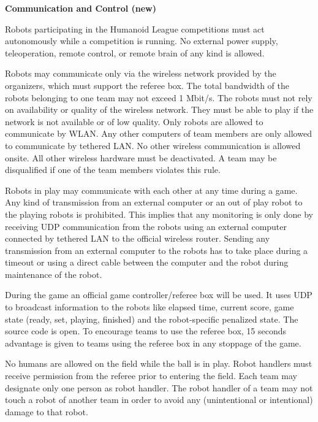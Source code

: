 {\bfseries Communication and Control (new)}

\headlinebox

Robots participating in the Humanoid League competitions must act autonomously while a competition is running. No external power supply, teleoperation, remote control, or remote brain of any kind is allowed.

\bigskip

Robots may communicate only via the wireless network provided by the organizers, which must support the referee box. The total bandwidth of the robots belonging to one team may not exceed 1 Mbit/s. The robots must not rely on availability or quality of the wireless network. They
must be able to play if the network is not available or of low quality. Only robots are allowed to communicate by WLAN. Any other computers of team members are only allowed to communicate by tethered LAN. No other wireless communication is allowed onsite. All other wireless hardware must be deactivated. A team may be disqualified if one of the team members violates this rule.

\bigskip

Robots in play may communicate with each other at any time during a game. Any kind of transmission from an external computer or an out of play robot to the playing robots is prohibited. This implies that any monitoring is only done by receiving UDP communication from the robots using an external computer connected by tethered LAN to the official wireless router. Sending any transmission from an external computer to the robots has to take place during a timeout or using a direct cable between the computer and the robot during maintenance of the robot.

\bigskip

During the game an official game controller/referee box will be used. It uses UDP to broadcast information to the robots like elapsed time, current score, game state (ready, set, playing, finished) and the robot-specific penalized state. The source code is open. To encourage teams to use the referee box, 15 seconds advantage is given to teams using the referee box in any stoppage of the game.

\bigskip

No humans are allowed on the field while the ball is in play. Robot handlers must receive permission from the referee prior to entering the field. Each team may designate only one person as robot handler. The robot handler of a team may not touch a robot of another team in order to avoid any (unintentional or intentional) damage to that robot. 

